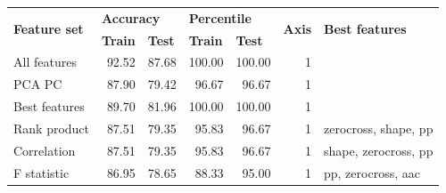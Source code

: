 \begin{table}[h]
\begin{adjustbox}{width=\textwidth}
\begin{tabular}{|l|rr|rr|r|l|}
\hline
\multirow{2}{*}{\textbf{Feature set}} & \multicolumn{2}{l|}{\textbf{Accuracy}}                                   & \multicolumn{2}{l|}{\textbf{Percentile}}                                 & \multicolumn{1}{l|}{\multirow{2}{*}{\textbf{Axis}}} & \multirow{2}{*}{\textbf{Best features}} \\ \cline{2-5}
                                      & \multicolumn{1}{l|}{\textbf{Train}} & \multicolumn{1}{l|}{\textbf{Test}} & \multicolumn{1}{l|}{\textbf{Train}} & \multicolumn{1}{l|}{\textbf{Test}} & \multicolumn{1}{l|}{}                               &                                         \\ \hline
All features                          & \multicolumn{1}{r|}{92.52}          & 87.68                              & \multicolumn{1}{r|}{100.00}         & 100.00                             & 1                                                   &                                         \\ \hline
PCA PC                                & \multicolumn{1}{r|}{87.90}          & 79.42                              & \multicolumn{1}{r|}{96.67}          & 96.67                              & 1                                                   &                                         \\ \hline
Best features                         & \multicolumn{1}{r|}{89.70}          & 81.96                              & \multicolumn{1}{r|}{100.00}         & 100.00                             & 1                                                   &                                         \\ \hline
Rank product                          & \multicolumn{1}{r|}{87.51}          & 79.35                              & \multicolumn{1}{r|}{95.83}          & 96.67                              & 1                                                   & zerocross, shape, pp                    \\ \hline
Correlation                           & \multicolumn{1}{r|}{87.51}          & 79.35                              & \multicolumn{1}{r|}{95.83}          & 96.67                              & 1                                                   & shape, zerocross, pp                    \\ \hline
F statistic                           & \multicolumn{1}{r|}{86.95}          & 78.65                              & \multicolumn{1}{r|}{88.33}          & 95.00                              & 1                                                   & pp, zerocross, aac                      \\ \hline

\end{tabular}
\end{adjustbox}
\end{table}
